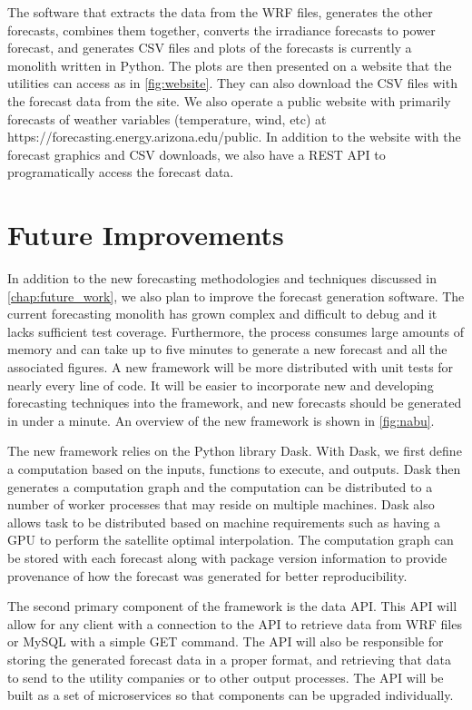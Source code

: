 The software that extracts the data from the WRF files, generates the
other forecasts, combines them together, converts the irradiance
forecasts to power forecast, and generates CSV files and plots of the
forecasts is currently a monolith written in Python.
The plots are then presented on a website that the utilities can
access as in \cref{fig:website}.
They can also download the CSV files with the forecast data from the site.
We also operate a public website with primarily forecasts of weather
variables (temperature, wind, etc) at
https://forecasting.energy.arizona.edu/public.
In addition to the website with the forecast graphics and CSV
downloads, we also have a REST API to programatically access the
forecast data.

\section{Future Improvements}
\label{sec:futurefx}

In addition to the new forecasting methodologies and techniques
discussed in \cref{chap:future_work}, we also plan to improve the
forecast generation software.
The current forecasting monolith has grown complex and difficult to
debug and it lacks sufficient test coverage.
Furthermore, the process consumes large amounts of memory and can take
up to five minutes to generate a new forecast and all the associated
figures.
A new framework will be more distributed with unit tests for nearly
every line of code.
It will be easier to incorporate new and developing
forecasting techniques into the framework, and new forecasts should be
generated in under a minute.
An overview of the new framework is shown in \cref{fig:nabu}.

The new framework relies on the Python library Dask.
With Dask, we first define a computation based on the inputs,
functions to execute, and outputs.
Dask then generates a computation graph and the computation can be
distributed to a number of worker processes that may reside on
multiple machines.
Dask also allows task to be distributed based on machine requirements
such as having a GPU to perform the satellite optimal interpolation.
The computation graph can be stored with each forecast along with
package version information to provide provenance of how the forecast
was generated for better reproducibility.

The second primary component of the framework is the data API.
This API will allow for any client with a connection to the API to
retrieve data from WRF files or MySQL with a simple GET command.
The API will also be responsible for storing the generated forecast
data in a proper format, and retrieving that data to send to the
utility companies or to other output processes.
The API will be built as a set of microservices so that components can
be upgraded individually.

